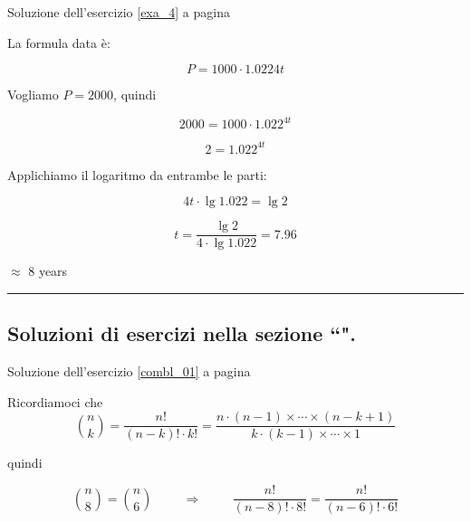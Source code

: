 \begin{minipage}{\textwidth}
Soluzione dell'esercizio \ref{exa_4} a pagina \pageref{exa_4}\label{sola_4}

La formula data è: 

\begin{equation*}
P = 1000 \cdot 1.0224t
\end{equation*}

Vogliamo $P=2000$, quindi 

\begin{equation*}
2000 = 1000 \cdot 1.022^{4t}
\end{equation*}

\begin{equation*}
2= 1.022^{4t}
\end{equation*}

Applichiamo il logaritmo da entrambe le parti:

\begin{equation*}
4t\cdot \lg 1.022 = \lg 2
\end{equation*}


\begin{equation*}
t=\frac{
\lg 2
}{
4\cdot\lg 1.022
} = 7.96
\end{equation*}

$\approx$ 8 years

\end{minipage}

\vspace{1cm}
\hrule
\vspace{1cm}


\subsection{Soluzioni di esercizi nella sezione ``\textbf{}".}

Soluzione dell'esercizio \ref{combl_01} a pagina \pageref{combl_01}\label{combs_01}

Ricordiamoci che 
\begin{equation*}
\binom{n}{k}=\frac{n!}{(n-k)!\cdot k!}
=\frac{
n\cdot(n-1)\times \cdots \times (n-k+1)
}{
k\cdot(k-1)\times \cdots \times 1
}
\end{equation*}

quindi

\begin{equation*}
\binom{n}{8}=\binom{n}{6}
\hspace{1cm}\Rightarrow \hspace{1cm}
\frac{n!}{(n-8)! \cdot 8!} = \frac{n!}{(n-6)! \cdot 6!}
\end{equation*}


